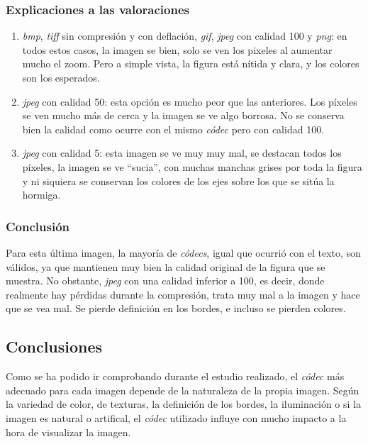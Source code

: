 \documentclass[11pt,a4paper]{article}
\begin{document}
\subsubsection{Explicaciones a las valoraciones}
\begin{enumerate}
	\item \textit{bmp}, \textit{tiff} sin compresión y con deflación, \textit{gif}, \textit{jpeg} con calidad 100 y \textit{png}: en todos estos casos, la imagen se bien, solo se ven los pixeles al aumentar mucho el zoom. Pero a simple vista, la figura está nítida y clara, y los colores son los esperados.
	\item \textit{jpeg} con calidad 50: esta opción es mucho peor que las anteriores. Los píxeles se ven mucho más de cerca y la imagen se ve algo borrosa. No se conserva bien la calidad como ocurre con el mismo \textit{códec} pero con calidad 100.
	\item \textit{jpeg} con calidad 5: esta imagen se ve muy muy mal, se destacan todos los píxeles, la imagen se ve ``sucia'', con muchas manchas grises por toda la figura y ni siquiera se conservan los colores de los ejes sobre los que se sitúa la hormiga.
\end{enumerate}

\subsubsection{Conclusión}
Para esta última imagen, la mayoría de \textit{códecs}, igual que ocurrió con el texto, son válidos, ya que mantienen muy bien la calidad original de la figura que se muestra. No obstante, \textit{jpeg} con una calidad inferior a 100, es decir, donde realmente hay pérdidas durante la compresión, trata muy mal a la imagen y hace que se vea mal. Se pierde definición en los bordes, e incluso se pierden colores.

\newpage

\subsection{Conclusiones}

Como se ha podido ir comprobando durante el estudio realizado, el \textit{códec} más adecuado para cada imagen depende de la naturaleza de la propia imagen. Según la variedad de color, de texturas, la definición de los bordes, la iluminación o si la imagen es natural o artifical, el \textit{códec} utilizado influye con mucho impacto a la hora de visualizar la imagen.\\
\end{document}
